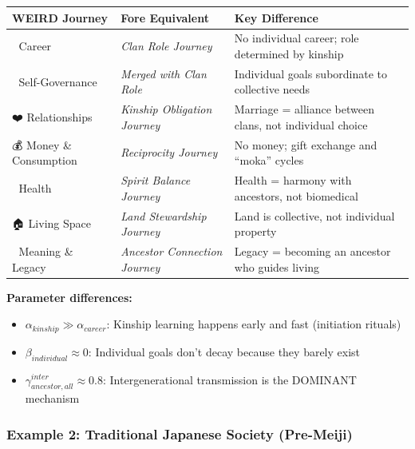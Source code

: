 {{{\begin{center}
\small
\begin{tabular}{@{}lll@{}}
\toprule
\textbf{WEIRD Journey} & \textbf{Fore Equivalent} & \textbf{Key Difference} \\
\midrule
💼 Career & \textit{Clan Role Journey} & No individual career; role determined by kinship \\
🧠 Self-Governance & \textit{Merged with Clan Role} & Individual goals subordinate to collective needs \\
❤️ Relationships & \textit{Kinship Obligation Journey} & Marriage = alliance between clans, not individual choice \\
💰 Money \& Consumption & \textit{Reciprocity Journey} & No money; gift exchange and ``moka'' cycles \\
🏥 Health & \textit{Spirit Balance Journey} & Health = harmony with ancestors, not biomedical \\
🏠 Living Space & \textit{Land Stewardship Journey} & Land is collective, not individual property \\
🧭 Meaning \& Legacy & \textit{Ancestor Connection Journey} & Legacy = becoming an ancestor who guides living \\
\bottomrule
\end{tabular}
\end{center}

\textbf{Parameter differences:}
\begin{itemize}[nosep]
\item $\alpha_{kinship} \gg \alpha_{career}$: Kinship learning happens early and fast (initiation rituals)
\item $\beta_{individual} \approx 0$: Individual goals don't decay because they barely exist
\item $\gamma^{inter}_{ancestor,all} \approx 0.8$: Intergenerational transmission is the DOMINANT mechanism
\end{itemize}

\subsubsection{Example 2: Traditional Japanese Society (Pre-Meiji)}

}}}
